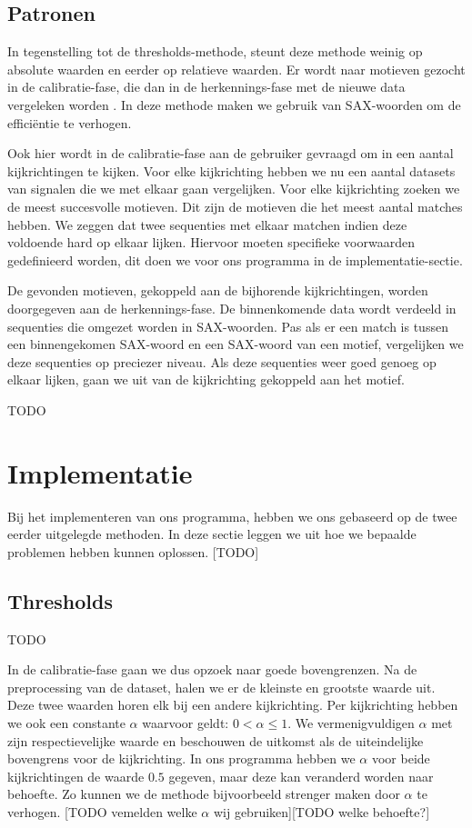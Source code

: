 \documentclass{article}
\begin{document}
\subsection{Patronen}

In tegenstelling tot de thresholds-methode, steunt deze methode weinig op absolute waarden en eerder op relatieve waarden. Er wordt naar motieven gezocht in de calibratie-fase, die dan in de herkennings-fase met de nieuwe data vergeleken worden \cite{motifs}. In deze methode maken we gebruik van SAX-woorden om de efficiëntie te verhogen.

Ook hier wordt in de calibratie-fase aan de gebruiker gevraagd om in een aantal kijkrichtingen te kijken. Voor elke kijkrichting hebben we nu een aantal datasets van signalen die we met elkaar gaan vergelijken. Voor elke kijkrichting zoeken we de meest succesvolle motieven. Dit zijn de motieven die het meest aantal matches hebben. We zeggen dat twee sequenties met elkaar matchen indien deze voldoende hard op elkaar lijken. Hiervoor moeten specifieke voorwaarden gedefinieerd worden, dit doen we voor ons programma in de implementatie-sectie.



De gevonden motieven, gekoppeld aan de bijhorende kijkrichtingen, worden doorgegeven aan de herkennings-fase. De binnenkomende data wordt verdeeld in sequenties die omgezet worden in SAX-woorden. Pas als er een match is tussen een binnengekomen SAX-woord en een SAX-woord van een motief, vergelijken we deze sequenties op preciezer niveau. Als deze sequenties weer goed genoeg op elkaar lijken, gaan we uit van de kijkrichting gekoppeld aan het motief.

TODO

\section{Implementatie}

Bij het implementeren van ons programma, hebben we ons gebaseerd op de twee eerder uitgelegde methoden. In deze sectie leggen we uit hoe we bepaalde problemen hebben kunnen oplossen. [TODO]

\subsection{Thresholds}

TODO

In de calibratie-fase gaan we dus opzoek naar goede bovengrenzen. Na de preprocessing van de dataset, halen we er de kleinste en grootste waarde uit. Deze twee waarden horen elk bij een andere kijkrichting. Per kijkrichting hebben we ook een constante $\alpha$ waarvoor geldt: $0 < \alpha \leq 1$. We vermenigvuldigen $\alpha$ met zijn respectievelijke waarde en beschouwen de uitkomst als de uiteindelijke bovengrens voor de kijkrichting. In ons programma hebben we $\alpha$ voor beide kijkrichtingen de waarde $0.5$ gegeven, maar deze kan veranderd worden naar behoefte. Zo kunnen we de methode bijvoorbeeld strenger maken door $\alpha$ te verhogen. [TODO vemelden welke $\alpha$ wij gebruiken][TODO welke behoefte?]
\end{document}

